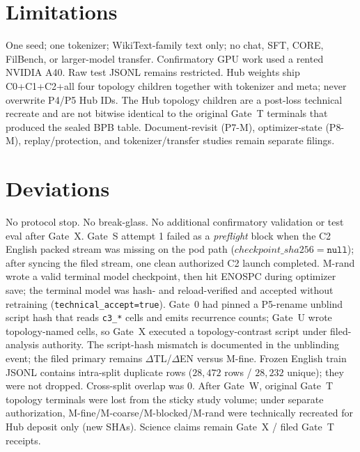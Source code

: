\documentclass[11pt,a4paper]{article}
\begin{document}
\section{Limitations}
\label{sec:limit}

One seed; one tokenizer; WikiText-family text only; no chat, SFT, CORE, FilBench, or larger-model transfer. Confirmatory GPU work used a rented NVIDIA A40. Raw test JSONL remains restricted. Hub weights ship C0+C1+C2+all four topology children together with tokenizer and meta; never overwrite P4/P5 Hub IDs. The Hub topology children are a post-loss technical recreate and are not bitwise identical to the original Gate~T terminals that produced the sealed BPB table. Document-revisit (P7-M), optimizer-state (P8-M), replay/protection, and tokenizer/transfer studies remain separate filings.

\section{Deviations}
\label{sec:dev}

No protocol stop. No break-glass. No additional confirmatory validation or test eval after Gate~X. Gate~S attempt 1 failed as a \emph{preflight} block when the C2 English packed stream was missing on the pod path ($checkpoint\_sha256=\texttt{null}$); after syncing the filed stream, one clean authorized C2 launch completed. M-rand wrote a valid terminal model checkpoint, then hit ENOSPC during optimizer save; the terminal model was hash- and reload-verified and accepted without retraining (\texttt{technical\_accept=true}). Gate~0 had pinned a P5-rename unblind script hash that reads \texttt{c3\_*} cells and emits recurrence counts; Gate~U wrote topology-named cells, so Gate~X executed a topology-contrast script under filed-analysis authority. The script-hash mismatch is documented in the unblinding event; the filed primary remains $\Delta$TL/$\Delta$EN versus M-fine. Frozen English train JSONL contains intra-split duplicate rows ($28{,}472$ rows / $28{,}232$ unique); they were not dropped. Cross-split overlap was 0. After Gate~W, original Gate~T topology terminals were lost from the sticky study volume; under separate authorization, M-fine/M-coarse/M-blocked/M-rand were technically recreated for Hub deposit only (new SHAs). Science claims remain Gate~X / filed Gate~T receipts.
\end{document}
